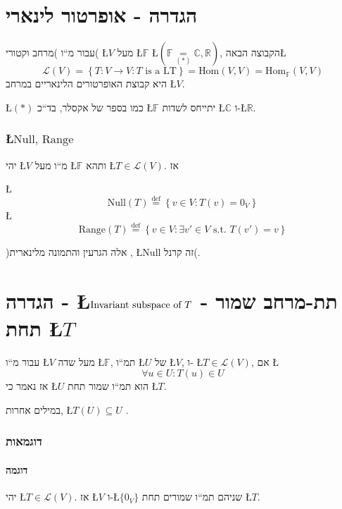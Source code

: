 \documentclass[english,hebrew]{article}
\begin{document}
\part{הגדרה - אופרטור לינארי}

עבור מ\textquotedblleft ו )מרחב וקטורי( \L{$V$} מעל \L{$\mathbb{F}$}
\L{$(\mathbb{F}\underset{(*)}{=}\mathbb{C},\mathbb{R})$}, הקבוצה
הבאה\L{%
\[
\mathcal{L}(V)=\left\{ T:V\rightarrow V:T\text{ is a LT}\right\} =\text{Hom}(V,V)=\text{Hom}_{\mathbb{F}}(V,V)
\]
}%
היא קבוצת האופרטורים הלינאריים במרחב \L{$V$}.

\L{$(*)$} כמו בספר של אקסלר, בד\textquotedblleft כ \L{$\mathbb{F}$}
יתייחס לשדות \L{$\mathbb{C}$} ו-\L{$\mathbb{R}$}.

\section{\L{$\text{Null, Range}$}}

יהי \L{$V$} מ\textquotedblleft ו מעל \L{$\mathbb{F}$} ותהא \L{$T\in\mathcal{L}(V)$}.
אז

\L{%
\[
\text{Null}(T)\overset{\text{def}}{=}\left\{ v\in V:T(v)=0_{V}\right\} 
\]
}%
\L{%
\[
\text{Range}(T)\overset{\text{def}}{=}\left\{ v\in V:\exists v'\in V\text{ s.t. }T(v')=v\right\} 
\]
}%

)אלה הגרעין והתמונה מלינארית {\endL}, \L{$\text{Null}$}
זה קרנל(.

\part{הגדרה - \L{$\text{Invariant subspace of \ensuremath{T}}$} - תת-מרחב
שמור תחת \L{$T$}}

עבור מ\textquotedblleft ו \L{$V$} מעל שדה \L{$\mathbb{F}$}, תמ\textquotedblleft ו
\L{$U$} של \L{$V$}, ו- \L{$T\in\mathcal{L}(V)$}, אם \L{%
\[
\forall u\in U:T(u)\in U
\]
}%
 אז נאמר כי \L{$U$} הוא תמ\textquotedblleft ו שמור תחת \L{$T$}.

במילים אחרות, \L{$T(U)\subseteq U$} . 

\section{דוגמאות}

\subsection{דוגמה{\normalsize{} }{\endL}}

יהי \L{$T\in\mathcal{L}(V)$}. אז \L{$V$} ו-\L{$\{0_{V}\}$} שניהם
תמ\textquotedblleft ו שמורים תחת \L{$T$}.
\end{document}
